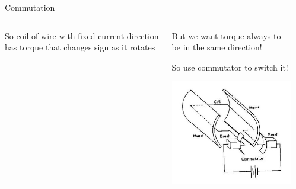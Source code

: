 \documentclass[compress]{beamer}
\begin{document}
\begin{frame}{Commutation}

    \begin{columns}
        \begin{column}{0.3\linewidth}
            So coil of wire with fixed current direction has torque that changes
            sign as it rotates

            \vspace{2em}
        \end{column}
        \begin{column}{0.3\linewidth}
            But we want torque always to be in the same direction!

            So use commutator to switch it!

            \begin{center}
                \includegraphics[width=1.2\columnwidth]{image22}
            \end{center}
        \end{column}
        \begin{column}{0.3\linewidth}


\end{column}
\end{columns}
\end{frame}
\end{document}
